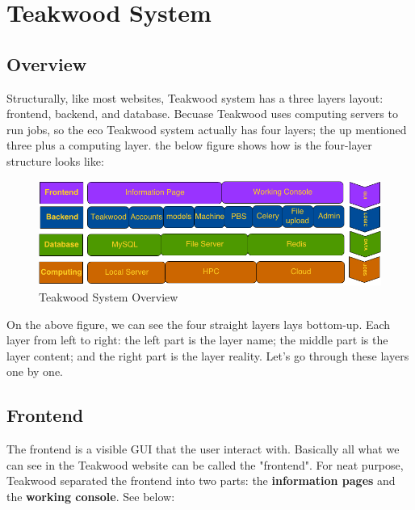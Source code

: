 \chapter{Teakwood System }

\section{Overview}
Structurally, like most websites, Teakwood system has a three layers layout: frontend, backend, and database. Becuase Teakwood uses computing servers to run jobs, so the eco Teakwood system actually has four layers; the up mentioned three plus a computing layer. the below figure shows how is the four-layer structure looks like:\\

\begin{figure}[htb]
\centering
\includegraphics[scale=0.5]{./system_structure} 
\caption{Teakwood System Overview}
\label{fig:label} %
\end{figure}

On the above figure, we can see the four straight layers lays bottom-up. Each layer from left to right: the left part is the layer name; the middle part is the layer content; and the right part is the layer reality. Let's go through these layers one by one.

\section{Frontend}
The frontend is a visible GUI that the user interact with. Basically all what we can see in the Teakwood website can be called the "frontend".  For neat purpose, Teakwood separated the frontend into two parts: the \textbf{information pages} and the \textbf{working console}. See below:

